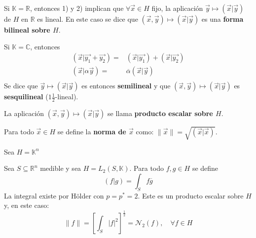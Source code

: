 \documentclass[12pt]{report}
\newcounter{it}
\theoremstyle{largebreak}
\newcommand\norm[1]{\ensuremath{\|#1\|}}
\newcommand\ora[1]{\ensuremath{\vec{#1}}}
\newcommand\pint[2]{\ensuremath{\left(#1\big| #2\right)}}
\newcommand\conj[1]{\ensuremath{\overline{#1}}}
\begin{document}
    \begin{obs}
        Si $\mathbb{K}=\mathbb{R}$, entonces 1) y 2) implican que $\forall \ora{x}\in H$ fijo, la aplicación $\ora{y}\mapsto\pint{\ora{x}}{\ora{y}}$ de $H$ en $\mathbb{R}$ es lineal. En este caso se dice que $(\ora{x},\ora{y})\mapsto\pint{\ora{x}}{\ora{y}}$ es una \textbf{forma bilineal sobre $H$}.

        Si $\mathbb{K}=\mathbb{C}$, entonces
        \begin{equation*}
            \begin{split}
                \pint{\ora{x}}{\ora{y_1}+\ora{y_2}}=&\pint{\ora{x}}{\ora{y_1}}+\pint{\ora{x}}{\ora{y_2}}\\
                \pint{\ora{x}}{\alpha\ora{y}}=&\conj{\alpha}\pint{\ora{x}}{\ora{y}}\\
            \end{split}
        \end{equation*}
        Se dice que $\ora{y}\mapsto\pint{\ora{x}}{\ora{y}}$ es entonces \textbf{semilineal} y que $(\ora{x},\ora{y})\mapsto\pint{\ora{x}}{\ora{y}}$ es \textbf{sesquilineal} ($1\frac{1}{2}$-lineal).

        La aplicación $(\ora{x},\ora{y})\mapsto\pint{\ora{x}}{\ora{y}}$ se llama \textbf{producto escalar sobre $H$}.
    \end{obs}

    \begin{mydef}
        Para todo $\ora{x}\in H$ se define la \textbf{norma de $\ora{x}$} como: $\norm{\ora{x}}=\sqrt{\pint{\ora{x}}{\ora{x}}}$.
    \end{mydef}

    \begin{exa}
        Sea $H=\mathbb{K}^n$
    \end{exa}

    \begin{exa}
        Sea $S\subseteq\mathbb{R}^n$ medible y sea $H=L_2(S,\mathbb{K})$. Para todo $f,g\in H$ se define
        \begin{equation*}
            \pint{f}{g}=\int_Sf\conj{g}
        \end{equation*}
        La integral existe por Hölder con $p=p^*=2$. Este es un producto escalar sobre $H$ y, en este caso:
        \begin{equation*}
            \norm{f}=\left[\int_S\big|f\big|^2 \right]^{\frac{1}{2}}=\mathcal{N}_2(f),\quad \forall f\in H
        \end{equation*}
    \end{exa}
\end{document}
